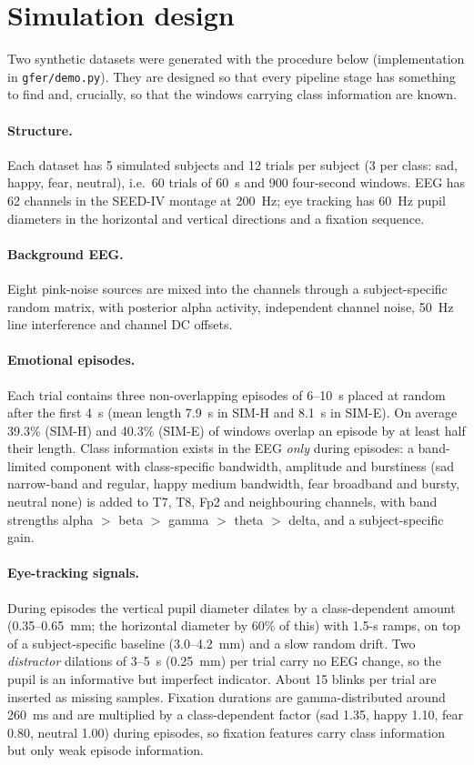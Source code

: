 \documentclass[11pt,a4paper]{article}
\begin{document}
\section{Simulation design}
\label{sec:data}

Two synthetic datasets were generated with the procedure below (implementation in \texttt{gfer/demo.py}). They are designed so that every pipeline stage has something to find and, crucially, so that the windows carrying class information are known.

\paragraph{Structure.} Each dataset has 5 simulated subjects and 12 trials per subject (3 per class: sad, happy, fear, neutral), i.e.\ 60 trials of 60~s and 900 four-second windows. EEG has 62 channels in the SEED-IV montage at 200~Hz; eye tracking has 60~Hz pupil diameters in the horizontal and vertical directions and a fixation sequence.

\paragraph{Background EEG.} Eight pink-noise sources are mixed into the channels through a subject-specific random matrix, with posterior alpha activity, independent channel noise, 50~Hz line interference and channel DC offsets.

\paragraph{Emotional episodes.} Each trial contains three non-overlapping episodes of 6--10~s placed at random after the first 4~s (mean length 7.9~s in SIM-H and 8.1~s in SIM-E). On average 39.3\% (SIM-H) and 40.3\% (SIM-E) of windows overlap an episode by at least half their length. Class information exists in the EEG \emph{only} during episodes: a band-limited component with class-specific bandwidth, amplitude and burstiness (sad narrow-band and regular, happy medium bandwidth, fear broadband and bursty, neutral none) is added to T7, T8, Fp2 and neighbouring channels, with band strengths alpha $>$ beta $>$ gamma $>$ theta $>$ delta, and a subject-specific gain.

\paragraph{Eye-tracking signals.} During episodes the vertical pupil diameter dilates by a class-dependent amount (0.35--0.65~mm; the horizontal diameter by 60\% of this) with 1.5-s ramps, on top of a subject-specific baseline (3.0--4.2~mm) and a slow random drift. Two \emph{distractor} dilations of 3--5~s (0.25~mm) per trial carry no EEG change, so the pupil is an informative but imperfect indicator. About 15 blinks per trial are inserted as missing samples. Fixation durations are gamma-distributed around 260~ms and are multiplied by a class-dependent factor (sad 1.35, happy 1.10, fear 0.80, neutral 1.00) during episodes, so fixation features carry class information but only weak episode information.
\end{document}
